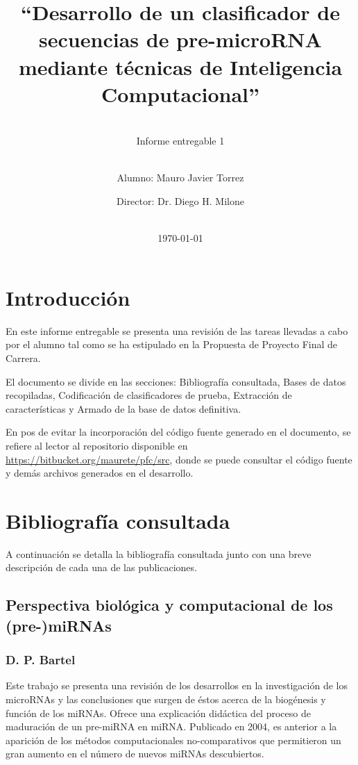 \documentclass[12pt,bibliography=oldstyle,DIV=12,parskip=half-,titlepage]{scrartcl}
\begin{document}
%
%
\titlehead{\center\large
    Universidad Nacional del Litoral\\
    Facultad de Ingeniería y Ciencias Hídricas
}
%
%
\title{\LARGE ``Desarrollo de un clasificador de secuencias de pre-microRNA
  mediante técnicas de Inteligencia Computacional''}
\subject{Proyecto Final de Carrera\\Ingeniería en
  Informática}
\subtitle{~\\[.2ex]Informe entregable 1\\[.2ex]~}
\author{{Alumno: Mauro Javier Torrez}\and{Director: Dr. Diego H. Milone}}
%
\date{~\\[2em]\today}
%
\renewcommand*{\titlepagestyle}{empty}
\maketitle
\setcounter{page}{1}
%
%
%
%
\section{Introducción}
En este informe entregable se presenta una revisión de las tareas
llevadas a cabo por el alumno tal como se ha estipulado en la
Propuesta de Proyecto Final de Carrera.

El documento se divide en las secciones: Bibliografía consultada,
Bases de datos recopiladas, Codificación de clasificadores de prueba,
Extracción de características y Armado de la base de datos definitiva.

En pos de evitar la incorporación del código fuente generado en el
documento, se refiere al lector al repositorio disponible en
\url{https://bitbucket.org/maurete/pfc/src}, donde se puede consultar
el código fuente y demás archivos generados en el desarrollo.
%
%
%
%
\section{Bibliografía consultada}
%
A continuación se detalla la bibliografía consultada junto con una
breve descripción de cada una de las publicaciones.
%
\subsection{Perspectiva biológica y computacional de los (pre-)miRNAs}
\subsubsection*{D. P. Bartel \cite{bartel116}}
Este trabajo se presenta una revisión de los desarrollos en la
investigación de los microRNAs y las conclusiones que surgen de éstos
acerca de la biogénesis y función de los miRNAs.  Ofrece una
explicación didáctica del proceso de maduración de un pre-miRNA en
miRNA.  Publicado en 2004, es anterior a la aparición de los métodos
computacionales no-comparativos que permitieron un gran aumento en el
número de nuevos miRNAs descubiertos.
%
\end{document}
